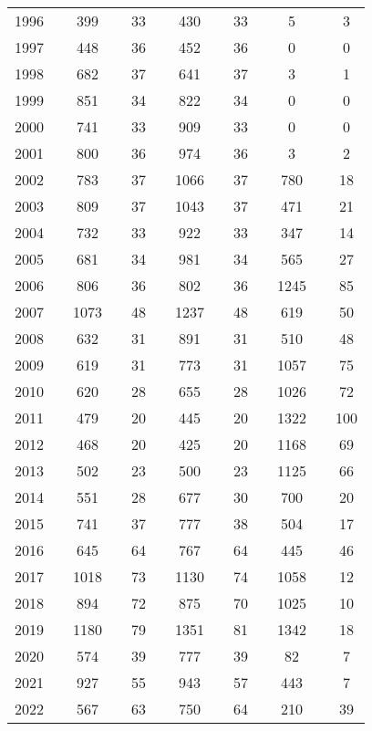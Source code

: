 \begin{table}[]
\begin{tabular}{rlclclclclclc}
1996 &  & 399 &  & 33 &  & 430 &  & 33 &  & 5 &  & 3 \\
1997 &  & 448 &  & 36 &  & 452 &  & 36 &  & 0 &  & 0 \\
1998 &  & 682 &  & 37 &  & 641 &  & 37 &  & 3 &  & 1 \\
1999 &  & 851 &  & 34 &  & 822 &  & 34 &  & 0 &  & 0 \\
2000 &  & 741 &  & 33 &  & 909 &  & 33 &  & 0 &  & 0 \\
2001 &  & 800 &  & 36 &  & 974 &  & 36 &  & 3 &  & 2 \\
2002 &  & 783 &  & 37 &  & 1066 &  & 37 &  & 780 &  & 18 \\
2003 &  & 809 &  & 37 &  & 1043 &  & 37 &  & 471 &  & 21 \\
2004 &  & 732 &  & 33 &  & 922 &  & 33 &  & 347 &  & 14 \\
2005 &  & 681 &  & 34 &  & 981 &  & 34 &  & 565 &  & 27 \\
2006 &  & 806 &  & 36 &  & 802 &  & 36 &  & 1245 &  & 85 \\
2007 &  & 1073 &  & 48 &  & 1237 &  & 48 &  & 619 &  & 50 \\
2008 &  & 632 &  & 31 &  & 891 &  & 31 &  & 510 &  & 48 \\
2009 &  & 619 &  & 31 &  & 773 &  & 31 &  & 1057 &  & 75 \\
2010 &  & 620 &  & 28 &  & 655 &  & 28 &  & 1026 &  & 72 \\
2011 &  & 479 &  & 20 &  & 445 &  & 20 &  & 1322 &  & 100 \\
2012 &  & 468 &  & 20 &  & 425 &  & 20 &  & 1168 &  & 69 \\
2013 &  & 502 &  & 23 &  & 500 &  & 23 &  & 1125 &  & 66 \\
2014 &  & 551 &  & 28 &  & 677 &  & 30 &  & 700 &  & 20 \\
2015 &  & 741 &  & 37 &  & 777 &  & 38 &  & 504 &  & 17 \\
2016 &  & 645 &  & 64 &  & 767 &  & 64 &  & 445 &  & 46 \\
2017 &  & 1018 &  & 73 &  & 1130 &  & 74 &  & 1058 &  & 12 \\
2018 &  & 894 &  & 72 &  & 875 &  & 70 &  & 1025 &  & 10 \\
2019 &  & 1180 &  & 79 &  & 1351 &  & 81 &  & 1342 &  & 18 \\
2020 &  & 574 &  & 39 &  & 777 &  & 39 &  & 82 &  & 7 \\
2021 &  & 927 &  & 55 &  & 943 &  & 57 &  & 443 &  & 7 \\
2022 &  & 567 &  & 63 &  & 750 &  & 64 &  & 210 &  & 39
\end{tabular}
\end{table}
\endgroup{}
\endgroup{}